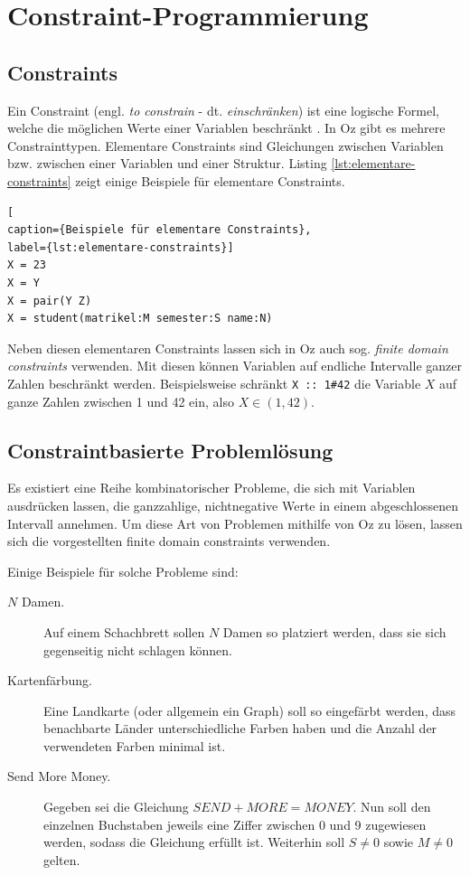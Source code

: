 \section{Constraint-Programmierung}
\subsection{Constraints}
Ein Constraint (engl. \textsl{to constrain} - dt. \textsl{einschränken}) ist 
eine logische Formel, welche die möglichen Werte einer Variablen beschränkt 
\cite{KI-LP96}. In Oz gibt es mehrere Constrainttypen. Elementare Constraints 
sind Gleichungen zwischen Variablen bzw. zwischen einer Variablen und einer 
Struktur. Listing \ref{lst:elementare-constraints} zeigt einige Beispiele für 
elementare Constraints.

\begin{lstlisting}[
caption={Beispiele für elementare Constraints}, 
label={lst:elementare-constraints}]
X = 23
X = Y
X = pair(Y Z)
X = student(matrikel:M semester:S name:N)
\end{lstlisting}

Neben diesen elementaren Constraints lassen sich in Oz auch sog. \textsl{finite 
domain constraints} verwenden. Mit diesen können Variablen auf endliche 
Intervalle ganzer Zahlen beschränkt werden. Beispielsweise schränkt 
\lstinline{X :: 1#42} die Variable $X$ auf ganze Zahlen zwischen 1 und 42 ein,
also $X \in (1, 42)$.

\subsection{Constraintbasierte Problemlösung}
Es existiert eine Reihe kombinatorischer Probleme, die sich mit Variablen 
ausdrücken lassen, die ganzzahlige, nichtnegative Werte in einem 
abgeschlossenen Intervall annehmen. Um diese Art von Problemen mithilfe von Oz 
zu lösen, lassen sich die vorgestellten finite domain constraints verwenden.

Einige Beispiele für solche Probleme sind:

\begin{description}
  \item[$N$ Damen.] Auf einem Schachbrett sollen $N$ Damen so platziert werden, 
  dass sie sich gegenseitig nicht schlagen können.
  \item[Kartenfärbung.] Eine Landkarte (oder allgemein ein Graph) soll so 
  eingefärbt werden, dass benachbarte Länder unterschiedliche Farben haben und 
  die Anzahl der verwendeten Farben minimal ist.
  \item[Send More Money.] Gegeben sei die Gleichung $SEND + MORE = MONEY$. Nun 
  soll den einzelnen Buchstaben jeweils eine Ziffer zwischen 0 und 9 zugewiesen 
  werden, sodass die Gleichung erfüllt ist. Weiterhin soll $S \neq 0$ sowie $M 
  \neq 0$ gelten.
\end{description}

